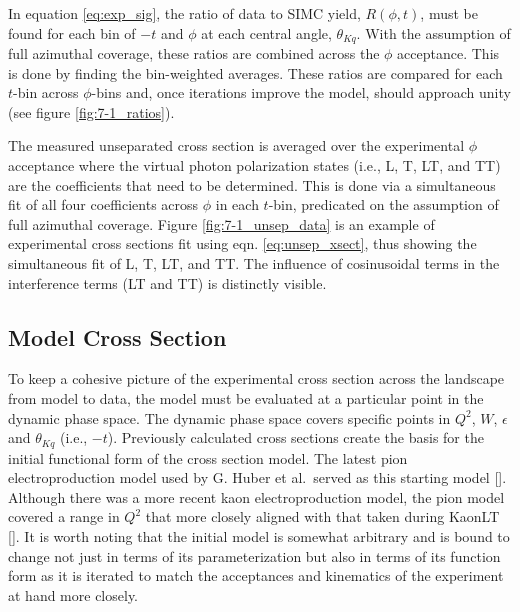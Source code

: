 \documentclass[
]{report}
\begin{document}


In equation \ref{eq:exp_sig}, the ratio of data to SIMC yield,
\(R(\phi,t)\), must be found for each bin of \(-t\) and \(\phi\) at each
central angle, \(\theta_{Kq}\). With the assumption of full azimuthal
coverage, these ratios are combined across the \(\phi\) acceptance. This
is done by finding the bin-weighted averages. These ratios are compared
for each \(t\)-bin across \(\phi\)-bins and, once iterations improve the
model, should approach unity (see figure \ref{fig:7-1_ratios}).



The measured unseparated cross section is averaged over the experimental
\(\phi\) acceptance where the virtual photon polarization states (i.e.,
L, T, LT, and TT) are the coefficients that need to be determined. This
is done via a simultaneous fit of all four coefficients across \(\phi\)
in each \(t\)-bin, predicated on the assumption of full azimuthal
coverage. Figure \ref{fig:7-1_unsep_data} is an example of experimental
cross sections fit using eqn. \ref{eq:unsep_xsect}, thus showing the
simultaneous fit of L, T, LT, and TT. The influence of cosinusoidal
terms in the interference terms (LT and TT) is distinctly visible.

\hypertarget{model-cross-section}{%
\subsection{Model Cross Section}\label{model-cross-section}}

To keep a cohesive picture of the experimental cross section across the
landscape from model to data, the model must be evaluated at a
particular point in the dynamic phase space. The dynamic phase space
covers specific points in \(Q^2\), \(W\), \(\epsilon\) and
\(\theta_{Kq}\) (i.e., \(-t\)). Previously calculated cross sections
create the basis for the initial functional form of the cross section
model. The latest pion electroproduction model used by G. Huber et
al.~served as this starting model {[}\cite{huber_separated_2015}{]}.
Although there was a more recent kaon electroproduction model, the pion
model covered a range in \(Q^2\) that more closely aligned with that
taken during KaonLT
{[}\cite{jlab_fpi-2_and_e93-018_collaboration_separated_2018}{]}. It is
worth noting that the initial model is somewhat arbitrary and is bound
to change not just in terms of its parameterization but also in terms of
its function form as it is iterated to match the acceptances and
kinematics of the experiment at hand more closely.
\end{document}
